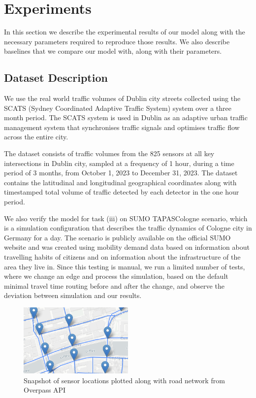 \section{Experiments}\label{sec:experiments}

In this section we describe the experimental results of our model along with the necessary parameters required to reproduce those results. We also describe baselines that we compare our model with, along with their parameters.

\subsection{Dataset Description}

We use the real world traffic volumes of Dublin city streets collected using the SCATS (Sydney Coordinated Adaptive Traffic System)\cite{scats} system over a three month period. The SCATS system is used in Dublin as an adaptive urban traffic management system that synchronises traffic signals and optimises traffic flow across the entire city.

The dataset consists of traffic volumes from the 825 sensors at all key intersections in Dublin city, sampled at a frequency of 1 hour, during a time period of 3 months, from October 1, 2023 to December 31, 2023. The dataset contains the latitudinal and longitudinal geographical coordinates along with timestamped total volume of traffic detected by each detector in the one hour period.

We also verify the model for task (iii) on SUMO\cite{sumo} TAPASCologne scenario\cite{tapas}, which is a simulation configuration that describes the traffic dynamics of Cologne city in Germany for a day. The scenario is publicly available on the official SUMO website and was created using mobility demand data based on information about travelling habits of citizens and on information about the infrastructure of the area they live in. Since this testing is manual, we run a limited number of tests, where we change an edge and process the simulation, based on the default minimal travel time routing before and after the change, and observe the deviation between simulation and our results.

\begin{figure}[htbp]
  \centering
  \includegraphics[width=0.5\textwidth]{dataset.png}
  \caption{Snapshot of sensor locations plotted along with road network from Overpass API}
  \label{fig:dataset}
\end{figure}


